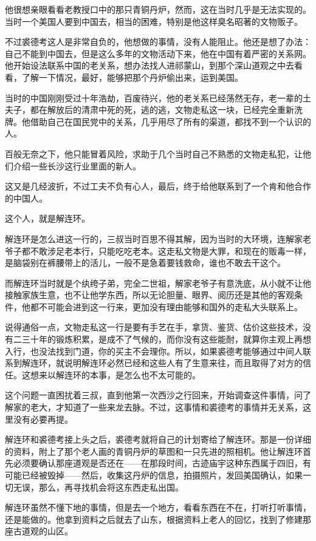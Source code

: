 他很想亲眼看看老教授口中的那只青铜丹炉，然而，这在当时几乎是无法实现的。当时一个美国人要到中国去，相当的困难，特别是他这样臭名昭著的文物贩子。

不过裘德考这人是非常自负的，他想做的事情，没有人能阻止。他还是想了办法：自己不能到中国去，但是这么多年的文物活动下来，他在中国有着严密的关系网。他开始设法联系中国的老关系，想办法找人进祁蒙山，到那个深山道观之中去看看，了解一下情况，最好，能够把那个丹炉偷出来，运到美国。

当时的中国刚刚受过十年浩劫，百废待兴，他的老关系已经荡然无存，老一辈的土夫子，都在解放后的清肃中死的死，逃的逃，文物走私这一块，已经完全重新洗牌。他借助自己在国民党中的关系，几乎用尽了所有的渠道，都找不到一个认识的人。

百般无奈之下，他只能冒着风险，求助于几个当时自己不熟悉的文物走私犯，让他们介绍一些长沙这行业里面的新人。

这又是几经波折，不过工夫不负有心人，最后，终于给他联系到了一个肯和他合作的中国人。

这个人，就是解连环。

解连环是怎么进这一行的，三叔当时百思不得其解，因为当时的大环境，连解家老爷子都不敢涉足老本行，只能吃吃老本。这走私文物是大罪，和现在的贩毒一样，是脑袋别在裤腰带上的活儿，一般不是急着要钱救命，谁也不敢去干这个。

而解连环当时就是个纨绔子弟，完全二世祖，解家老爷子有意洗底，从小就不让他接触家族生意，也不让他学东西，所以无论胆量、眼界、阅历还是其他的客观条件，他都不可能会进到这一行来，更加没有理由能够和国外的走私大头联系上。

说得通俗一点，文物走私这一行是要有手艺在手，拿货、鉴货、估价这些技术，没有二三十年的锻炼积累，是成不了气候的，而你没有这些能耐，就算你主观上再想入行，也没法找到门道，你的买主不会理你。所以，如果裘德考能够通过中间人联系到解连环，就说明解连环必然已经和这些人有了生意来往，而且取得了对方的信任。这想来以解连环的本事，是怎么也不太可能的。

这个问题一直困扰着三叔，直到他第一次西沙之行回来，开始调查这件事情，问了解家的老大，才知道了一些来龙去脉。不过，这事情和裘德考的事情并无关系，这里没有必要再提。

解连环和裘德考接上头之后，裘德考就将自己的计划寄给了解连环。那是一份详细的资料，附上了那个老人画的青铜丹炉的草图和一只先进的照相机。他让解连环首先必须要确认那座道观是否还在——在那段时间，古迹庙宇这种东西属于四旧，有可能已经被毁掉——然后，收集这丹炉的信息，拍摄照片，发回美国确认，如果一切无误，那么，再寻找机会将这东西走私出国。

解连环虽然不懂下地的事情，但是去一个地方，看看东西在不在，打听打听事情，还是能做的。他拿到资料之后就去了山东，根据资料上老人的回忆，找到了修建那座古道观的山区。

